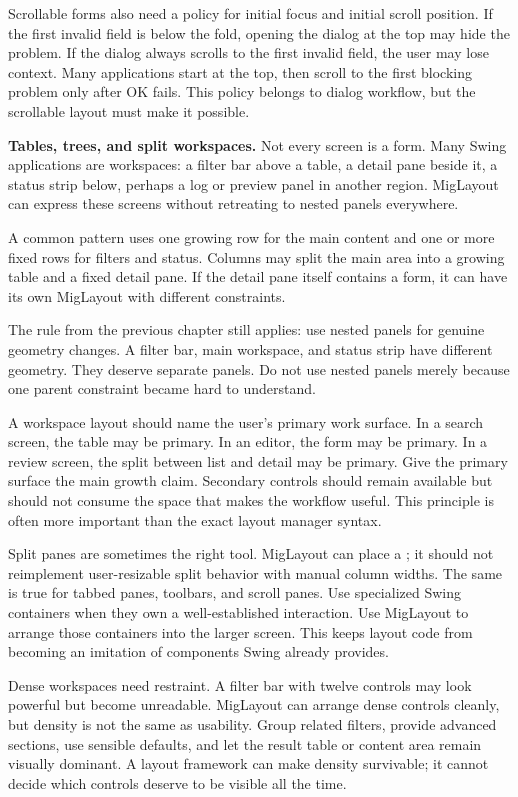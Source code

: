 Scrollable forms also need a policy for initial focus and initial scroll
position. If the first invalid field is below the fold, opening the dialog at
the top may hide the problem. If the dialog always scrolls to the first invalid
field, the user may lose context. Many applications start at the top, then
scroll to the first blocking problem only after OK fails. This policy belongs to
dialog workflow, but the scrollable layout must make it possible.

\textbf{Tables, trees, and split workspaces.}
Not every screen is a form. Many Swing applications are workspaces: a filter bar above a table, a detail pane beside it, a status strip below, perhaps a log or preview panel in another region. MigLayout can express these screens without retreating to nested  panels everywhere.

A common pattern uses one growing row for the main content and one or more fixed rows for filters and status. Columns may split the main area into a growing table and a fixed detail pane. If the detail pane itself contains a form, it can have its own MigLayout with different constraints.

The rule from the previous chapter still applies: use nested panels for genuine geometry changes. A filter bar, main workspace, and status strip have different geometry. They deserve separate panels. Do not use nested panels merely because one parent constraint became hard to understand.

A workspace layout should name the user's primary work surface. In a search
screen, the table may be primary. In an editor, the form may be primary. In a
review screen, the split between list and detail may be primary. Give the
primary surface the main growth claim. Secondary controls should remain
available but should not consume the space that makes the workflow useful. This
principle is often more important than the exact layout manager syntax.

Split panes are sometimes the right tool. MigLayout can place a
; it should not reimplement user-resizable split behavior with
manual column widths. The same is true for tabbed panes, toolbars, and scroll
panes. Use specialized Swing containers when they own a well-established
interaction. Use MigLayout to arrange those containers into the larger screen.
This keeps layout code from becoming an imitation of components Swing already
provides.

Dense workspaces need restraint. A filter bar with twelve controls may look
powerful but become unreadable. MigLayout can arrange dense controls cleanly,
but density is not the same as usability. Group related filters, provide
advanced sections, use sensible defaults, and let the result table or content
area remain visually dominant. A layout framework can make density survivable;
it cannot decide which controls deserve to be visible all the time.


